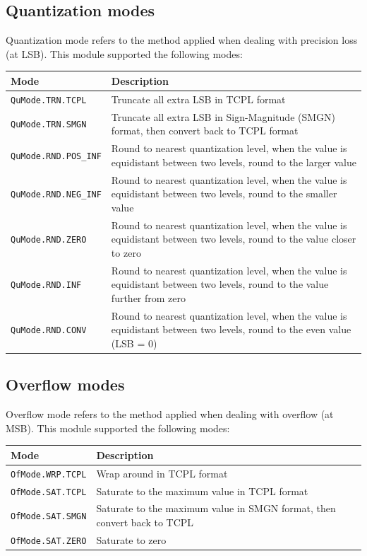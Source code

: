 \documentclass[a4paper, oneside]{report}
\begin{document}
            \subsection{Quantization modes}\label{ch:func:sec:param:subsec:QuMode}
            Quantization mode refers to the method applied when dealing with precision loss (at LSB). This module supported the following modes:
            \begin{longtable}{lp{}}
                \toprule
                \textbf{Mode} & \textbf{Description} \\
                \midrule
                \texttt{QuMode.TRN.TCPL} & Truncate all extra LSB in TCPL format \\
                \texttt{QuMode.TRN.SMGN} & Truncate all extra LSB in Sign-Magnitude (SMGN) format, then convert back to TCPL format \\
                \texttt{QuMode.RND.POS\_INF} & Round to nearest quantization level, when the value is equidistant between two levels, round to the larger value  \\
                \texttt{QuMode.RND.NEG\_INF} & Round to nearest quantization level, when the value is equidistant between two levels, round to the smaller value  \\
                \texttt{QuMode.RND.ZERO} & Round to nearest quantization level, when the value is equidistant between two levels, round to the value closer to zero  \\
                \texttt{QuMode.RND.INF} & Round to nearest quantization level, when the value is equidistant between two levels, round to the value further from zero  \\
                \texttt{QuMode.RND.CONV} & Round to nearest quantization level, when the value is equidistant between two levels, round to the even value (LSB = 0) \\
                \bottomrule
            \end{longtable}

        \subsection{Overflow modes}\label{ch:func:sec:param:subsec:OfMode}
            Overflow mode refers to the method applied when dealing with overflow (at MSB). This module supported the following modes:
            \begin{longtable}{lp{}}
                \toprule
                \textbf{Mode} & \textbf{Description} \\
                \midrule
                \texttt{OfMode.WRP.TCPL} & Wrap around in TCPL format \\
                \texttt{OfMode.SAT.TCPL} & Saturate to the maximum value in TCPL format \\
                \texttt{OfMode.SAT.SMGN} & Saturate to the maximum value in SMGN format, then convert back to TCPL \\
                \texttt{OfMode.SAT.ZERO} & Saturate to zero \\
                \bottomrule
            \end{longtable}           
\end{document}
